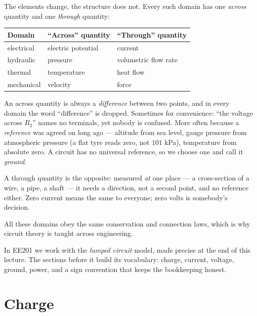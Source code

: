 \documentclass[11pt,a4paper]{article}
\begin{document}
\begin{ideabox}
The elements change, the structure does not. Every such domain has one \emph{across}
quantity and one \emph{through} quantity:

\begin{center}
\small
\begin{tabular}{@{}l l l@{}}
\toprule
\textbf{Domain} & \textbf{``Across'' quantity} & \textbf{``Through'' quantity}\\
\midrule
electrical & electric potential & current\\
hydraulic  & pressure           & volumetric flow rate\\
thermal    & temperature        & heat flow\\
mechanical & velocity           & force\\
\bottomrule
\end{tabular}
\end{center}

An across quantity is always a \emph{difference} between two points, and in every domain
the word ``difference'' is dropped. Sometimes for convenience: ``the voltage across
$R_2$'' names no terminals, yet nobody is confused. More often because a \emph{reference}
was agreed on long ago --- altitude from sea level, gauge pressure from atmospheric
pressure (a flat tyre reads zero, not $101$ kPa), temperature from absolute zero. A
circuit has no universal reference, so we choose one and call it \emph{ground}.

A through quantity is the opposite: measured \emph{at} one place --- a cross-section of a
wire, a pipe, a shaft --- it needs a direction, not a second point, and no reference
either. Zero current means the same to everyone; zero volts is somebody's decision.

All these domains obey the same conservation and connection laws, which is why circuit
theory is taught across engineering.
\end{ideabox}

In EE201 we work with the \emph{lumped circuit} model, made precise at the end of this
lecture. The sections before it build its vocabulary: charge, current, voltage, ground,
power, and a sign convention that keeps the bookkeeping honest.

\section{Charge}
\end{document}
